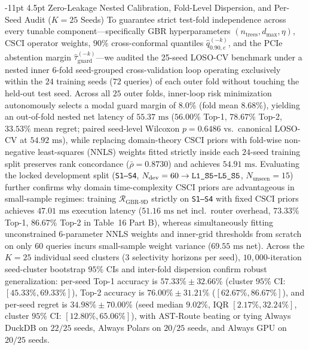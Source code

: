 \documentclass[10pt,a4paper]{article}
\makeatletter
\renewcommand\subsubsection{\@startsection{subsubsection}{3}{\z@}%
  {-11pt \@plus -2.5pt \@minus -1pt}%
  {4.5pt \@plus 1pt}%
  {\normalfont\normalsize\bfseries}}
\makeatother
\begin{document}
\subsubsection{Zero-Leakage Nested Calibration, Fold-Level Dispersion, and Per-Seed Audit (\texorpdfstring{$K=25$}{K=25} Seeds)} To guarantee strict test-fold independence across every tunable component---specifically GBR hyperparameters $(n_{\text{trees}}, d_{\text{max}}, \eta)$, $\text{CSCI}$ operator weights, $90\%$ cross-conformal quantiles $\hat{q}_{0.90,e}^{(-k)}$, and the PCIe abstention margin $\hat{\tau}_{\text{guard}}^{(-k)}$---we audited the 25-seed LOSO-CV benchmark under a nested inner 6-fold seed-grouped cross-validation loop operating exclusively within the $24$ training seeds ($72$ queries) of each outer fold without touching the held-out test seed. Across all $25$ outer folds, inner-loop risk minimization autonomously selects a modal guard margin of $8.0\%$ (fold mean $8.68\%$), yielding an out-of-fold nested net latency of $55.37\text{ ms}$ ($56.00\%$ Top-1, $78.67\%$ Top-2, $33.53\%$ mean regret; paired seed-level Wilcoxon $p=0.6486$ vs.\ canonical LOSO-CV at $54.92\text{ ms}$), while replacing domain-theory $\text{CSCI}$ priors with fold-wise non-negative least-squares (NNLS) weights fitted strictly inside each $24$-seed training split preserves rank concordance ($\bar{\rho}=0.8730$) and achieves $54.91\text{ ms}$. Evaluating the locked development split (\texttt{S1--S4}, $N_{\text{dev}}=60 \rightarrow \texttt{L1\_\allowbreak{}S5--L5\_\allowbreak{}S5}$, $N_{\text{unseen}}=15$) further confirms why domain time-complexity $\text{CSCI}$ priors are advantageous in small-sample regimes: training $\mathcal{R}_{\text{GBR-9D}}$ strictly on \texttt{S1--S4} with fixed $\text{CSCI}$ priors achieves $47.01\text{ ms}$ execution latency ($51.16\text{ ms}$ net incl.\ router overhead, $73.33\%$ Top-1, $86.67\%$ Top-2 in Table~16 Part B), whereas simultaneously fitting unconstrained $6$-parameter NNLS weights and inner-grid thresholds from scratch on only $60$ queries incurs small-sample weight variance ($69.55\text{ ms}$ net). Across the $K=25$ individual seed clusters ($3$ selectivity horizons per seed), $10{,}000$-iteration seed-cluster bootstrap $95\%$ CIs and inter-fold dispersion confirm robust generalization: per-seed Top-1 accuracy is $57.33\% \pm 32.66\%$ (cluster $95\%$ CI: $[45.33\%, 69.33\%]$), Top-2 accuracy is $76.00\% \pm 31.21\%$ ($[62.67\%, 86.67\%]$), and per-seed regret is $34.98\% \pm 70.00\%$ (seed median $9.02\%$, IQR $[2.17\%, 32.24\%]$, cluster $95\%$ CI: $[12.80\%, 65.06\%]$), with AST-Route beating or tying Always DuckDB on $22/25$ seeds, Always Polars on $20/25$ seeds, and Always GPU on $20/25$ seeds.
\end{document}
